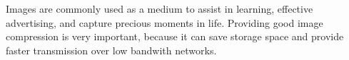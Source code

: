 Images are commonly used as a medium to assist in learning, effective advertising, and capture precious moments in life. 
Providing good image compression is very important, because it can save storage space and provide faster transmission over low bandwith networks. 